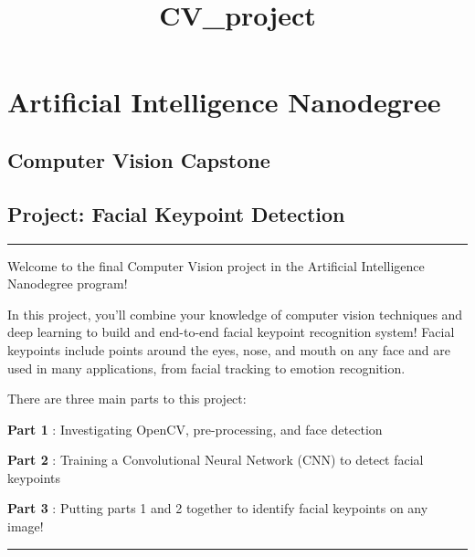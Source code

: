 \documentclass[11pt]{article}
\title{CV\_project}
\begin{document}
    
    
    \maketitle
    
    

    
    \hypertarget{artificial-intelligence-nanodegree}{%
\section{Artificial Intelligence
Nanodegree}\label{artificial-intelligence-nanodegree}}

\hypertarget{computer-vision-capstone}{%
\subsection{Computer Vision Capstone}\label{computer-vision-capstone}}

\hypertarget{project-facial-keypoint-detection}{%
\subsection{Project: Facial Keypoint
Detection}\label{project-facial-keypoint-detection}}

\begin{center}\rule{0.5\linewidth}{\linethickness}\end{center}

Welcome to the final Computer Vision project in the Artificial
Intelligence Nanodegree program!

In this project, you'll combine your knowledge of computer vision
techniques and deep learning to build and end-to-end facial keypoint
recognition system! Facial keypoints include points around the eyes,
nose, and mouth on any face and are used in many applications, from
facial tracking to emotion recognition.

There are three main parts to this project:

\textbf{Part 1} : Investigating OpenCV, pre-processing, and face
detection

\textbf{Part 2} : Training a Convolutional Neural Network (CNN) to
detect facial keypoints

\textbf{Part 3} : Putting parts 1 and 2 together to identify facial
keypoints on any image!

\begin{center}\rule{0.5\linewidth}{\linethickness}\end{center}
\end{document}
